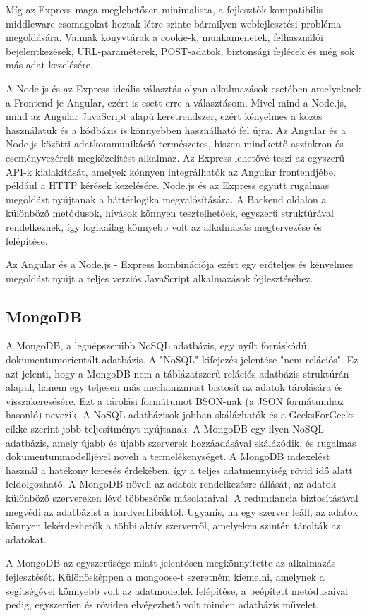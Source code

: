 Míg az Express maga meglehetősen minimalista, a fejlesztők kompatibilis middleware-csomagokat hoztak létre szinte bármilyen webfejlesztési probléma megoldására. Vannak könyvtárak a cookie-k, munkamenetek, felhasználói bejelentkezések, URL-paraméterek, POST-adatok, biztonsági fejlécek és még sok más adat kezelésére.\newline

A Node.js és az Express ideális választás olyan alkalmazások esetében amelyeknek a Frontend-je Angular, ezért is esett erre a választásom. Mivel mind a Node.js, mind az Angular JavaScript alapú keretrendszer, ezért kényelmes a közös használatuk és a kódbázis is könnyebben használható fel újra.  Az Angular és a Node.js közötti adatkommunikáció természetes, hiszen mindkettő aszinkron és eseményvezérelt megközelítést alkalmaz. Az Express lehetővé teszi az egyszerű API-k kialakítását, amelyek könnyen integrálhatók az Angular frontendjébe, például a HTTP kérések kezelésére. Node.js és az Express együtt rugalmas megoldást nyújtanak a háttérlogika megvalósítására. A Backend oldalon a különböző metódusok, hívások könnyen tesztelhetőek, egyszerű struktúrával rendelkeznek, így logikailag könnyebb volt az alkalmazás megtervezése és felépítése. 

Az Angular és a Node.js - Express kombinációja ezért egy erőteljes és kényelmes megoldást nyújt a teljes verziós JavaScript alkalmazások fejlesztéséhez. 
\cite{Node}
\subsection{MongoDB}
A MongoDB, a legnépszerűbb NoSQL adatbázis, egy nyílt forráskódú dokumentumorientált adatbázis. A "NoSQL" kifejezés jelentése "nem relációs". Ez azt jelenti, hogy a MongoDB nem a táblázatszerű relációs adatbázis-struktúrán alapul, hanem egy teljesen más mechanizmust biztosít az adatok tárolására és visszakeresésére. Ezt a tárolási formátumot BSON-nak (a JSON formátumhoz hasonló) nevezik. A NoSQL-adatbázisok jobban skálázhatók és a GeeksForGeeks cikke szerint\cite{MongoDB} jobb teljesítményt nyújtanak. A MongoDB egy ilyen NoSQL adatbázis, amely újabb és újabb szerverek hozzáadásával skálázódik, és rugalmas dokumentummodelljével növeli a termelékenységet. A MongoDB indexelést használ a hatékony keresés érdekében, így a teljes adatmennyiség rövid idő alatt feldolgozható. A MongoDB növeli az adatok rendelkezésre állását, az adatok különböző szervereken lévő többszörös másolataival. A redundancia biztosításával megvédi az adatbázist a hardverhibáktól. Ugyanis, ha egy szerver leáll, az adatok könnyen lekérdezhetők a többi aktív szerverről, amelyeken szintén tárolták az adatokat. 

A MongoDB az egyszerűsége miatt jelentősen megkönnyítette az alkalmazás fejlesztését. Különösképpen a mongoose-t \cite{Mongoose} szeretném kiemelni, amelynek a segítségével könnyebb volt az adatmodellek felépítése, a beépített metódusaival pedig, egyszerűen és röviden elvégezhető volt minden adatbázis művelet.
\cite{MongoDB}